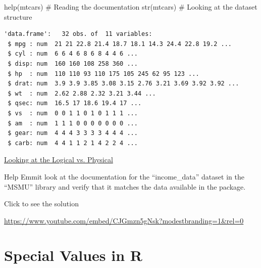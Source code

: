 \documentclass[
  letterpaper,
  DIV=11,
  numbers=noendperiod]{scrreprt}
\newenvironment{Shaded}{\begin{snugshade}}{\end{snugshade}}
\newcommand{\CommentTok}[1]{\textcolor[rgb]{0.37,0.37,0.37}{#1}}
\newcommand{\FunctionTok}[1]{\textcolor[rgb]{0.28,0.35,0.67}{#1}}
\newcommand{\NormalTok}[1]{\textcolor[rgb]{0.00,0.23,0.31}{#1}}
\begin{document}
\begin{Shaded}
\begin{Highlighting}[]
\FunctionTok{help}\NormalTok{(mtcars) }\CommentTok{\# Reading the documentation}
\FunctionTok{str}\NormalTok{(mtcars) }\CommentTok{\# Looking at the dataset structure}
\end{Highlighting}
\end{Shaded}

\begin{verbatim}
'data.frame':   32 obs. of  11 variables:
 $ mpg : num  21 21 22.8 21.4 18.7 18.1 14.3 24.4 22.8 19.2 ...
 $ cyl : num  6 6 4 6 8 6 8 4 4 6 ...
 $ disp: num  160 160 108 258 360 ...
 $ hp  : num  110 110 93 110 175 105 245 62 95 123 ...
 $ drat: num  3.9 3.9 3.85 3.08 3.15 2.76 3.21 3.69 3.92 3.92 ...
 $ wt  : num  2.62 2.88 2.32 3.21 3.44 ...
 $ qsec: num  16.5 17 18.6 19.4 17 ...
 $ vs  : num  0 0 1 1 0 1 0 1 1 1 ...
 $ am  : num  1 1 1 0 0 0 0 0 0 0 ...
 $ gear: num  4 4 4 3 3 3 3 4 4 4 ...
 $ carb: num  4 4 1 1 2 1 4 2 2 4 ...
\end{verbatim}

\begin{watch}{}{}
    \href{https://youtu.be/e70L-Zy__0I}{Looking at the Logical vs. Physical}
\end{watch}

\begin{tcolorbox}[enhanced jigsaw, leftrule=.75mm, arc=.35mm, coltitle=black, rightrule=.15mm, bottomrule=.15mm, toprule=.15mm, left=2mm, colbacktitle=quarto-callout-tip-color!10!white, title=\textcolor{quarto-callout-tip-color}{\faLightbulb}\hspace{0.5em}{Try it Out}, toptitle=1mm, breakable, colframe=quarto-callout-tip-color-frame, bottomtitle=1mm, titlerule=0mm, colback=white, opacityback=0, opacitybacktitle=0.6]

Help Emmit look at the documentation for the ``income\_data'' dataset in
the ``MSMU'' library and verify that it matches the data available in
the package.

Click to see the solution

\url{https://www.youtube.com/embed/CJGmzn5gNsk?modestbranding=1&rel=0}

\end{tcolorbox}

\section{Special Values in R}\label{special-values-in-r}
\end{document}
